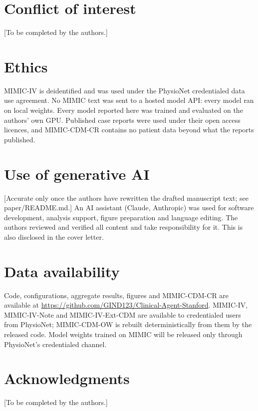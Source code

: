 \documentclass[11pt]{article}
\begin{document}
\section*{Conflict of interest}
[To be completed by the authors.]

\section*{Ethics}
MIMIC-IV is deidentified and was used under the PhysioNet credentialed data use agreement. No MIMIC text was sent to a hosted model API: every model ran on local weights. Every model reported here was trained and evaluated on the authors' own GPU. Published case reports were used under their open access licences, and MIMIC-CDM-CR contains no patient data beyond what the reports published.

\section*{Use of generative AI}
[Accurate only once the authors have rewritten the drafted manuscript text; see paper/README.md.] An AI assistant (Claude, Anthropic) was used for software development, analysis support, figure preparation and language editing. The authors reviewed and verified all content and take responsibility for it. This is also disclosed in the cover letter.

\section*{Data availability}
Code, configurations, aggregate results, figures and MIMIC-CDM-CR are available at \url{https://github.com/GIND123/Clinical-Agent-Stanford}. MIMIC-IV, MIMIC-IV-Note and MIMIC-IV-Ext-CDM are available to credentialed users from PhysioNet; MIMIC-CDM-OW is rebuilt deterministically from them by the released code. Model weights trained on MIMIC will be released only through PhysioNet's credentialed channel.

\section*{Acknowledgments}
[To be completed by the authors.]
\end{document}
